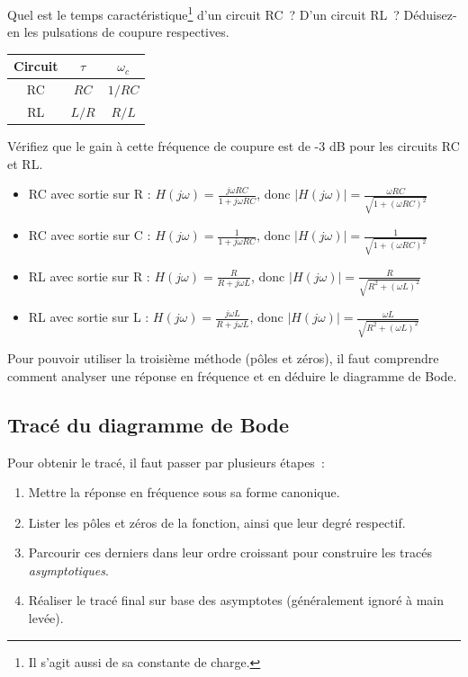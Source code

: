 {
Quel est le temps caractéristique\footnote{Il s'agit aussi de sa constante de charge.} d'un circuit RC~? D'un circuit RL~?
Déduisez-en les pulsations de coupure respectives.
}
{
  \begin{center}
    \begin{tabular}{ccc}
    Circuit & $\tau$ & $\omega_c$ \\ \hline
    RC & $RC$ & $1/RC$ \\
    RL & $L/R$ & $R/L$ \\
    \end{tabular}
  \end{center}
}

{
Vérifiez que le gain à cette fréquence de coupure est de -3 dB pour les circuits RC et RL.
}
{
  \begin{itemize}
    \item RC avec sortie sur R : $H(j\omega) = \frac{j\omega R C}{1 + j\omega R C}$, donc $|H(j\omega)| = \frac{\omega R C}{\sqrt{1 + (\omega R C)^2}}$
    \item RC avec sortie sur C : $H(j\omega) = \frac{1}{1 + j\omega R C}$, donc $|H(j\omega)| = \frac{1}{\sqrt{1 + (\omega R C)^2}}$
    \item RL avec sortie sur R : $H(j\omega) = \frac{R}{R + j\omega L}$, donc $|H(j\omega)| = \frac{R}{\sqrt{R^2 + (\omega L)^2}}$
    \item RL avec sortie sur L : $H(j\omega) = \frac{j\omega L}{R + j\omega L}$, donc $|H(j\omega)| = \frac{\omega L}{\sqrt{R^2 + (\omega L)^2}}$
  \end{itemize}
}

Pour pouvoir utiliser la troisième méthode (pôles et zéros), il faut comprendre comment analyser une réponse en fréquence et en déduire le diagramme de Bode.

\subsection{Tracé du diagramme de Bode}

Pour obtenir le tracé, il faut passer par plusieurs étapes~:
\begin{enumerate}
  \item Mettre la réponse en fréquence sous sa forme canonique.
  \item Lister les pôles et zéros de la fonction, ainsi que leur degré respectif.
  \item Parcourir ces derniers dans leur ordre croissant pour construire les tracés \textit{asymptotiques}.
  \item Réaliser le tracé final sur base des asymptotes (généralement ignoré à main levée).
\end{enumerate}

